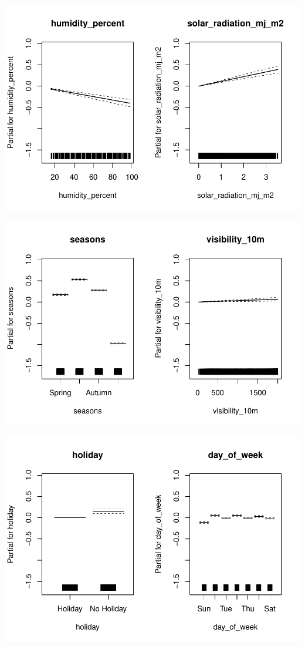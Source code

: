 \documentclass[
  11pt,
  letterpaper,
]{article}
\begin{document}
\begin{center}\includegraphics[width=1.2\linewidth,]{Final_Project_files/figure-latex/unnamed-chunk-43-3} \end{center}

\begin{center}\includegraphics[width=1.2\linewidth,]{Final_Project_files/figure-latex/unnamed-chunk-43-4} \end{center}

\begin{center}\includegraphics[width=1.2\linewidth,]{Final_Project_files/figure-latex/unnamed-chunk-43-5} \end{center}
\end{document}
